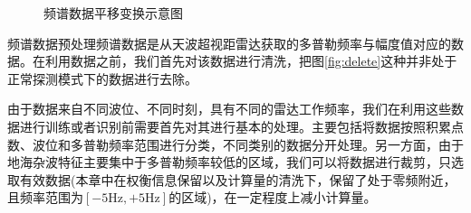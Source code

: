 \begin{figure}[H]
	\centering
	\hfil

	\caption{频谱数据平移变换示意图}
	\label{fig:fft}
\end{figure}

频谱数据预处理频谱数据是从天波超视距雷达获取的多普勒频率与幅度值对应的数据。在利用数据之前，我们首先对该数据进行清洗，把图\ref{fig:delete}这种并非处于正常探测模式下的数据进行去除。

由于数据来自不同波位、不同时刻，具有不同的雷达工作频率，我们在利用这些数据进行训练或者识别前需要首先对其进行基本的处理。主要包括将数据按照积累点数、波位和多普勒频率范围进行分类，不同类别的数据分开处理。另一方面，由于地海杂波特征主要集中于多普勒频率较低的区域，我们可以将数据进行裁剪，只选取有效数据(本章中在权衡信息保留以及计算量的清洗下，保留了处于零频附近，且频率范围为$[-5\text{Hz},+5\text{Hz}]$的区域)，在一定程度上减小计算量。

